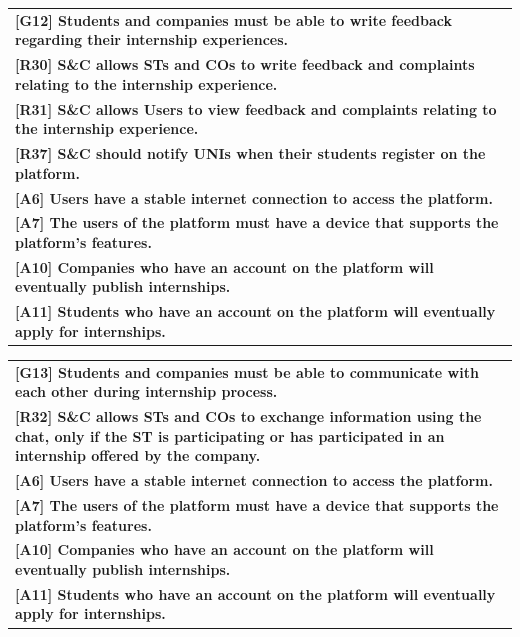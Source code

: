 \begin{center}
    \begin{tabular}{|p{37em}|}
        \rowcolor{bluepoli!40} %
        \hline
        \textbf{[G12] Students and companies must be able to write feedback regarding their internship experiences.} \\
        \rowcolor{bluepoli!15}
        \textbf{[R30] S\&C allows STs and COs to write feedback and complaints relating to the internship experience.} \\
        \rowcolor{bluepoli!15}
        \textbf{[R31] S\&C allows Users to view feedback and complaints relating to the internship experience.} \\
        \rowcolor{bluepoli!15}
        \textbf{[R37] S\&C should notify UNIs when their students register on the platform.} \\
        \textbf{[A6] Users have a stable internet connection to access the platform.}\\
        \textbf{[A7] The users of the platform must have a device that supports the platform's features.}\\
        \textbf{[A10] Companies who have an account on the platform will eventually publish internships.}\\
        \textbf{[A11] Students who have an account on the platform will eventually apply for internships.}\\
        \hline
    \end{tabular}
\end{center}

\begin{center}
    \begin{tabular}{|p{37em}|}
        \rowcolor{bluepoli!40} %
        \hline
        \textbf{[G13] Students and companies must be able to communicate with each other during internship process.} \\
        \rowcolor{bluepoli!15}
        \textbf{[R32] S\&C allows STs and COs to exchange information using the chat, only if the ST is participating 
        or has participated in an internship offered by the company.} \\
        \textbf{[A6] Users have a stable internet connection to access the platform.}\\
        \textbf{[A7] The users of the platform must have a device that supports the platform's features.}\\
        \textbf{[A10] Companies who have an account on the platform will eventually publish internships.}\\
        \textbf{[A11] Students who have an account on the platform will eventually apply for internships.}\\
        \hline
    \end{tabular}
\end{center}

